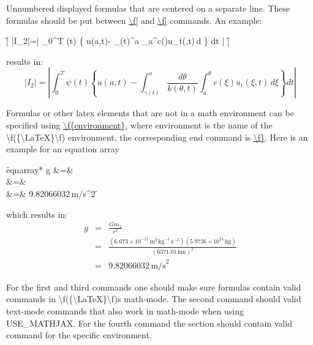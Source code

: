 \begin{DoxyEnumerate}
\item Unnumbered displayed formulas that are centered on a separate line. These formulas should be put between \mbox{\hyperlink{commands_cmdfbropen}{\textbackslash{}f\mbox{[}}} and \mbox{\hyperlink{commands_cmdfbrclose}{\textbackslash{}f\mbox{]}}} commands. An example\+: \begin{DoxyVerb}  \f[
    |I_2|=\left| \int_{0}^T \psi(t) 
             \left\{ 
                u(a,t)-
                \int_{\gamma(t)}^a 
                \int_{a}^\theta c(\xi)u_t(\xi,t)\,d\xi
             \right\} dt
          \right|
  \f]
\end{DoxyVerb}
 results in\+: \[ |I_2|=\left| \int_{0}^T \psi(t) \left\{ u(a,t)- \int_{\gamma(t)}^a \frac{d\theta}{k(\theta,t)} \int_{a}^\theta c(\xi)u_t(\xi,t)\,d\xi \right\} dt \right| \] 
\item Formulas or other latex elements that are not in a math environment can be specified using \mbox{\hyperlink{commands_cmdfcurlyopen}{\textbackslash{}f\{environment\}}}, where {\ttfamily environment} is the name of the \textbackslash{}f(\{\textbackslash{}\+La\+TeX\}\textbackslash{}f) environment, the corresponding end command is \mbox{\hyperlink{commands_cmdfcurlyclose}{\textbackslash{}f\}}}. Here is an example for an equation array \begin{DoxyVerb}   \f{eqnarray*}{
        g &=&  \\ 
          &=&  \\ 
          &=& 9.82066032\,\mbox{m/s}^2
   \f}
\end{DoxyVerb}
 which results in\+: \begin{eqnarray*} g &=& \frac{Gm_2}{r^2} \\ &=& \frac{(6.673 \times 10^{-11}\,\mbox{m}^3\,\mbox{kg}^{-1}\, \mbox{s}^{-2})(5.9736 \times 10^{24}\,\mbox{kg})}{(6371.01\,\mbox{km})^2} \\ &=& 9.82066032\,\mbox{m/s}^2 \end{eqnarray*} 
\end{DoxyEnumerate}For the first and third commands one should make sure formulas contain valid commands in \textbackslash{}f(\{\textbackslash{}\+La\+TeX\}\textbackslash{}f)\textquotesingle{}s math-\/mode. The second command should valid text-\/mode commands that also work in math-\/mode when using U\+S\+E\+\_\+\+M\+A\+T\+H\+J\+AX. For the fourth command the section should contain valid command for the specific environment.

